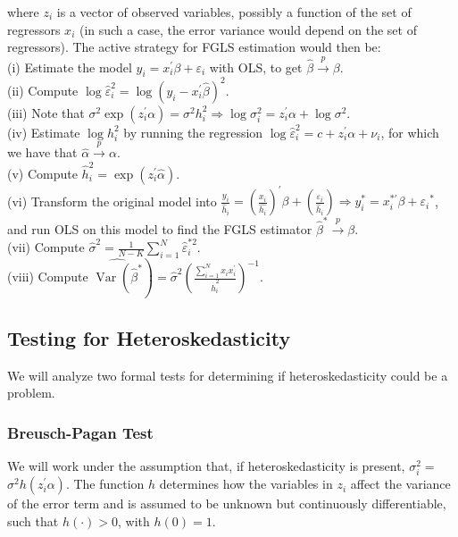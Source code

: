 where $z_{i}$ is a vector of observed variables, possibly a function of the set of regressors $x_{i}$ (in such a case, the error variance would depend on the set of regressors). The active strategy for FGLS estimation would then be:\\
(i) Estimate the model $y_{i}=x_{i}^{\prime} \beta+\varepsilon_{i}$ with OLS, to get $\widehat{\beta} \xrightarrow{p} \beta$.\\
(ii) Compute $\log \widehat{\varepsilon}_{i}^{2}=\log \left(y_{i}-x_{i}^{\prime} \widehat{\beta}\right)^{2}$.\\
(iii) Note that $\sigma^{2} \exp \left(z_{i}^{\prime} \alpha\right)=\sigma^{2} h_{i}^{2} \Longrightarrow \log \sigma_{i}^{2}=z_{i}^{\prime} \alpha+\log \sigma^{2}$.\\
(iv) Estimate $\log h_{i}^{2}$ by running the regression $\log \widehat{\varepsilon}_{i}^{2}=c+z_{i}^{\prime} \alpha+\nu_{i}$, for which we have that $\widehat{\alpha} \xrightarrow{p} \alpha$.\\
(v) Compute $\widehat{h}_{i}^{2}=\exp \left(z_{i}^{\prime} \widehat{\alpha}\right)$.\\
(vi) Transform the original model into $\frac{y_{i}}{\hat{h}_{i}}=\left(\frac{x_{i}}{\widehat{h_{i}}}\right)^{\prime} \beta+\left(\frac{\varepsilon_{i}}{\widehat{h}_{i}}\right) \Longrightarrow y_{i}^{*}=x_{i}^{* \prime} \beta+\varepsilon_{i}{ }^{*}$, and run OLS on this model to find the FGLS estimator $\widehat{\beta}^{*} \xrightarrow{p} \beta$.\\
(vii) Compute $\widehat{\sigma}^{2}=\frac{1}{N-K} \sum_{i=1}^{N} \widehat{\varepsilon}_{i}^{* 2}$.\\
(viii) Compute $\left.\widehat{\operatorname{Var}\left(\widehat{\beta}^{*}\right.}\right)=\widehat{\sigma}^{2}\left(\frac{\sum_{i=1}^{N} x_{i} x_{i}^{\prime}}{\widehat{h}_{i}^{2}}\right)^{-1}$.

\subsection{Testing for Heteroskedasticity}
We will analyze two formal tests for determining if heteroskedasticity could be a problem.

\subsubsection{Breusch-Pagan Test}
We will work under the assumption that, if heteroskedasticity is present, $\sigma_{i}^{2}=$ $\sigma^{2} h\left(z_{i}^{\prime} \alpha\right)$. The function $h$ determines how the variables in $z_{i}$ affect the variance of the error term and is assumed to be unknown but continuously differentiable, such that $h(\cdot)>0$, with $h(0)=1$.

